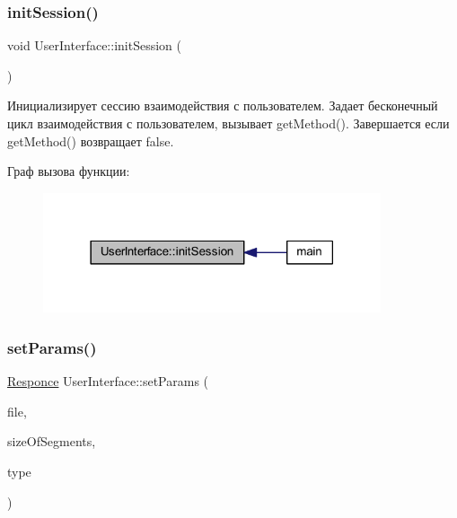 \subsubsection{\texorpdfstring{init\+Session()}{initSession()}}
{\footnotesize\ttfamily void User\+Interface\+::init\+Session (\begin{DoxyParamCaption}{ }\end{DoxyParamCaption})}



Инициализирует сессию взаимодействия с пользователем. Задает бесконечный цикл взаимодействия с пользователем, вызывает get\+Method(). Завершается если get\+Method() возвращает false. 

Граф вызова функции\+:\nopagebreak
\begin{figure}[H]
\begin{center}
\leavevmode
\includegraphics[width=282pt]{class_user_interface_a6c7f9ef9faa40eaf4760d57e89228786_icgraph}
\end{center}
\end{figure}
\hypertarget{class_user_interface_a595a469d83a351719c75c65fbf4a6fbe}{}\label{class_user_interface_a595a469d83a351719c75c65fbf4a6fbe} 
\subsubsection{\texorpdfstring{set\+Params()}{setParams()}}
{\footnotesize\ttfamily \hyperlink{_structures_8h_a9864d6ef28dd6e38416afac4426b3491}{Responce} User\+Interface\+::set\+Params (\begin{DoxyParamCaption}\item[{\hyperlink{class_file_manager}{File\+Manager} $\ast$}]{file,  }\item[{long long}]{size\+Of\+Segments,  }\item[{\hyperlink{_structures_8h_adbb15722785daaf5166f7ea34323854c}{Type\+Of\+Sort}}]{type }\end{DoxyParamCaption})\hspace{0.3cm}{\ttfamily [private]}}



